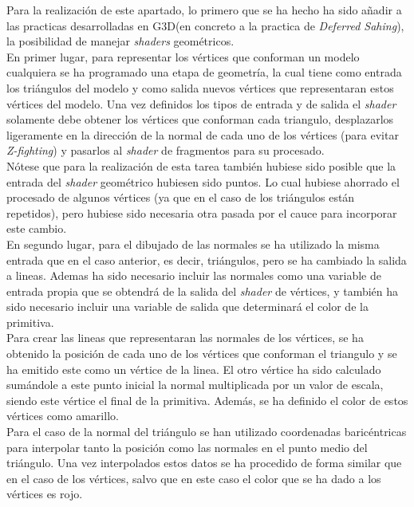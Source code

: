 \documentclass[10pt,oneside,a4paper]{article}
\begin{document}
Para la realización de este apartado, lo primero que se ha hecho ha sido añadir a las practicas desarrolladas en G3D(en concreto a la practica de \textit{Deferred Sahing}),
la posibilidad de manejar \textit{shaders} geométricos.\\

En primer lugar, para representar los vértices que conforman un modelo cualquiera se ha programado una etapa de geometría,
la cual tiene como entrada los triángulos del modelo y como salida nuevos vértices que representaran estos vértices del modelo.
Una vez definidos los tipos de entrada y de salida el \textit{shader} solamente debe obtener los vértices que conforman cada triangulo,
desplazarlos ligeramente en la dirección de la normal de cada uno de los vértices (para evitar \textit{Z-fighting}) y pasarlos al \textit{shader} de fragmentos para su procesado.\\

Nótese que para la realización de esta tarea también hubiese sido posible que la entrada del \textit{shader} geométrico hubiesen sido puntos.
Lo cual hubiese ahorrado el procesado de algunos vértices (ya que en el caso de los triángulos están repetidos), pero hubiese sido necesaria otra pasada por el cauce para incorporar este cambio.\\

En segundo lugar, para el dibujado de las normales se ha utilizado la misma entrada que en el caso anterior, es decir, triángulos, pero se ha cambiado la salida a lineas. Ademas ha sido necesario
incluir las normales como una variable de entrada propia que se obtendrá de la salida del \textit{shader} de vértices, y también ha sido necesario incluir una variable de salida que determinará el color de la primitiva.\\

Para crear las lineas que representaran las normales de los vértices, se ha obtenido la posición de cada uno de los vértices que conforman el triangulo y se ha emitido este como un vértice de la linea. El otro vértice ha sido calculado sumándole a este punto inicial la normal multiplicada por un valor de escala, siendo este vértice el final de la primitiva. Además, se ha definido el color de estos vértices como amarillo.\\

Para el caso de la normal del triángulo se han utilizado coordenadas baricéntricas para interpolar tanto la posición como las normales en el punto medio del triángulo. Una vez interpolados estos datos se ha procedido de forma similar que en el caso de los vértices, salvo que en este caso el color que se ha dado a los vértices es rojo.\\
\end{document}

